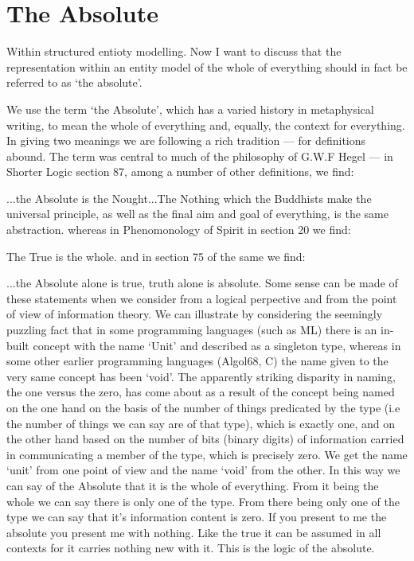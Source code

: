 \section{The Absolute}
Within structured entioty modelling.
Now  I want to discuss that the representation within an entity model of the whole of everything should in fact be referred to as `the absolute'.

We use the term ‘the Absolute’, which has a varied history in metaphysical writing, to mean the whole of everything and, equally, the context for everything. In giving two meanings we are following a rich tradition — for definitions abound. The term was central to much of the philosophy of G.W.F Hegel — in Shorter Logic section 87, among a number of other definitions, we find:

...the Absolute is the Nought...The Nothing which the Buddhists make the universal principle, as well as the final aim and goal of everything, is the same abstraction.
whereas in Phenomonology of Spirit in section 20 we find:

The True is the whole.
and in section 75 of the same we find:

...the Absolute alone is true, truth alone is absolute.
Some sense can be made of these statements when we consider from a logical perpective and from the point of view of information theory. We can illustrate by considering the seemingly puzzling fact that in some programming languages (such as ML) there is an in-built concept with the name ‘Unit’ and described as a singleton type, whereas in some other earlier programming languages (Algol68, C) the name given to the very same concept has been ‘void’. The apparently striking disparity in naming, the one versus the zero, has come about as a result of the concept being named on the one hand on the basis of the number of things predicated by the type (i.e the number of things we can say are of that type), which is exactly one, and on the other hand based on the number of bits (binary digits) of information carried in communicating a member of the type, which is precisely zero. We get the name ‘unit’ from one point of view and the name ‘void’ from the other. In this way we can say of the Absolute that it is the whole of everything. From it being the whole we can say there is only one of the type. From there being only one of the type we can say that it's information content is zero. If you present to me the absolute you present me with nothing. Like the true it can be assumed in all contexts for it carries nothing new with it. This is the logic of the absolute.

